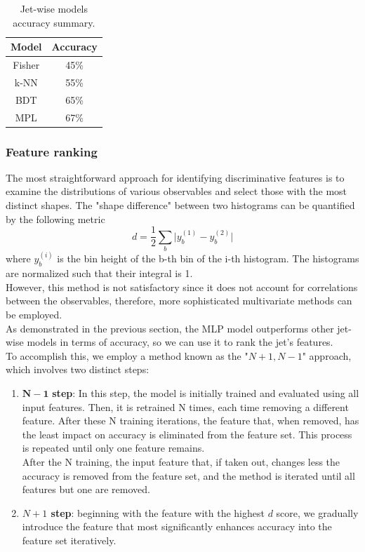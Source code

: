 \begin{table}[H]
    \centering
    \begin{tabular}{c|c}
    \toprule
        \textbf{Model} & \textbf{Accuracy} \\
        \midrule
        Fisher & 45\%\\
        k-NN & 55\%\\
        BDT  & 65\%\\
        MPL  & 67\%\\
    \end{tabular}
    \caption{Jet-wise models accuracy summary.}
    \label{tab:jet_wise_summary}
\end{table}
\subsubsection*{Feature ranking}
The most straightforward approach for identifying discriminative features is to examine the distributions of various
observables and select those with the most distinct
shapes.
The "shape difference" between two histograms can be
quantified by the following metric
\begin{equation}
    d=\frac{1}{2}\sum_b \bigg| y_b^{(1)}-y_b^{(2)} \bigg|
\end{equation}
where $y_b^{(i)}$ is the bin height of the b-th bin of the i-th
histogram. The histograms are normalized such that
their integral is 1.\\
However, this method is not satisfactory since it does not account for correlations between the observables, therefore, more sophisticated multivariate methods can be employed.\\
As demonstrated in the previous section, the MLP model outperforms other jet-wise models in terms of accuracy, so we can use it to rank the jet's features.\\
To accomplish this, we employ a method known as the "$N+1, N-1$" approach, which involves two distinct steps:
\begin{enumerate}
    \item $\bm{N-1}$ \textbf{step}: In this step, the model is initially trained and evaluated using all input features. Then, it is retrained N times, each time removing a different feature. After these N training iterations, the feature that, when removed, has the least impact on accuracy is eliminated from the feature set. This process is repeated until only one feature remains.\\
    After the N training, the input feature that, if taken out, changes less the accuracy is removed from the feature set, and the method is iterated until all features but one are removed.
    \item \textbf{$N+1$ step}: beginning with the feature with the highest $d$ score, we gradually introduce the feature that most significantly enhances accuracy into the feature set iteratively.
\end{enumerate}
